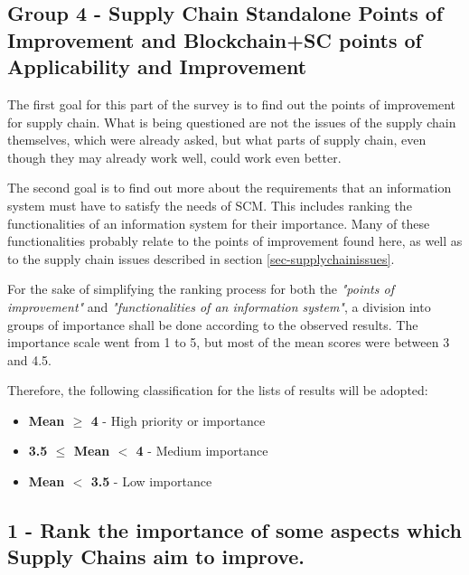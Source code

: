 
\subsection{Group 4 - Supply Chain Standalone Points of Improvement and Blockchain+SC points of Applicability and Improvement}
\label{sec-survey-improvement-functionalities}

The first goal for this part of the survey is to find out the points of improvement for supply chain. What is being questioned are not the issues of the supply chain themselves, which were already asked, but what parts of supply chain, even though they may already work well, could work even better.

The second goal is to find out more about the requirements that an information system must have to satisfy the needs of SCM. This includes ranking the functionalities of an information system for their importance. Many of these functionalities probably relate to the points of improvement found here, as well as to the supply chain issues described in section \ref{sec-supplychainissues}.




For the sake of simplifying the ranking process for both the \textit{"points of improvement"} and \textit{"functionalities of an information system"}, a division into groups of importance shall be done according to the observed results. The importance scale went from 1 to 5, but most of the mean scores were between 3 and 4.5. 

Therefore, the following classification for the lists of results will be adopted: 

\begin{itemize}
    \item \textbf{Mean 	$\geq$ 4} - High priority or importance
    \item \textbf{3.5 $\leq$ Mean $<$ 4} - Medium importance 
    \item \textbf{Mean $<$ 3.5} - Low importance
\end{itemize}

\subsection*{1 - Rank the importance of some aspects which Supply Chains aim to improve.}
 
